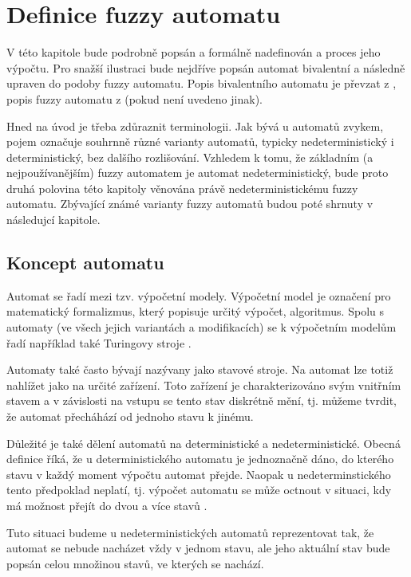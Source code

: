 \documentclass[a4paper,10pt]{article}
\begin{document}
\section{Definice fuzzy automatu}
V této kapitole bude podrobně popsán a formálně nadefinován  a proces jeho výpočtu. Pro snažší ilustraci bude nejdříve popsán automat bivalentní a následně upraven do podoby fuzzy automatu. Popis bivalentního automatu je převzat z \cite{HopUl-IntrAutTheLangComp}, popis fuzzy automatu z \cite{GonGar-FuzzLangInfRanAccGuzzAutPumLemDetProc} (pokud není uvedeno jinak).

Hned na úvod je třeba zdůraznit terminologii. Jak bývá u automatů zvykem, pojem  označuje souhrnně různé varianty automatů, typicky nedeterministický i deterministický, bez dalšího rozlišování. Vzhledem k tomu, že základním (a nejpoužívanějším) fuzzy automatem je automat nedeterministický, bude proto druhá polovina této kapitoly věnována právě nedeterministickému fuzzy automatu. Zbývající známé varianty fuzzy automatů budou poté shrnuty v následujcí kapitole.


\subsection{Koncept automatu}
Automat se řadí mezi tzv. výpočetní modely. Výpočetní model je označení pro matematický formalizmus, který popisuje určitý výpočet, algoritmus. Spolu s automaty (ve všech jejich variantách a modifikacích) se k výpočetním modelům řadí například také Turingovy stroje \cite{MorMal-FuzzyAutLang}. 

Automaty také často bývají nazývany jako stavové stroje. Na automat lze totiž nahlížet jako na určité zařízení. Toto zařízení je charakterizováno svým vnitřním stavem a v závislosti na vstupu se tento stav diskrétně mění, tj. můžeme tvrdit, že automat přecháhází od jednoho stavu k jinému.

Důležité je také dělení automatů na deterministické a nedeterministické. Obecná definice říká, že u deterministického automatu je jednoznačně dáno, do kterého stavu v každý moment výpočtu automat přejde. Naopak u nedeterminstického tento předpoklad neplatí, tj. výpočet automatu se může octnout v situaci, kdy má možnost přejít do dvou a více stavů .

Tuto situaci budeme u nedeterministických automatů reprezentovat tak, že automat se nebude nacházet vždy v jednom stavu, ale jeho aktuální stav bude popsán celou množinou stavů, ve kterých se nachází.
\end{document}
